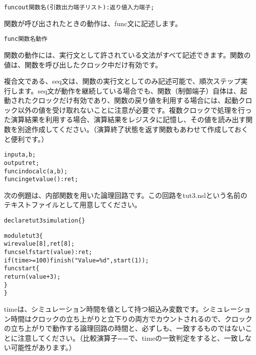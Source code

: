 \begin{reviewemlist}
\begin{alltt}
func\textunderscore{}out 関数名(引数出力端子リスト)  : 返り値入力端子 ;
\end{alltt}
\end{reviewemlist}

関数が呼び出されたときの動作は、func文に記述します。

\begin{reviewemlist}
\begin{alltt}
func 関数名 動作
\end{alltt}
\end{reviewemlist}

関数の動作には、実行文として許されている文法がすべて記述できます。関数の値は、関数を呼び出したクロック中だけ有効です。

複合文である、seq文は、関数の実行文としてのみ記述可能で、順次ステップ実行します。seq文が動作を継続している場合でも、関数（制御端子）自体は、起動されたクロックだけ有効であり、関数の戻り値を利用する場合には、起動クロック以外の値を受け取れないことに注意が必要です。複数クロックで処理を行った演算結果を利用する場合、演算結果をレジスタに記憶し、その値を読み出す関数を別途作成してください。（演算終了状態を返す関数もあわせて作成しておくと便利です。）

\begin{reviewemlist}
\begin{alltt}
input a,b;
output ret;
func\textunderscore{}in  do\textunderscore{}calc(a,b);
func\textunderscore{}in  get\textunderscore{}value(): ret;
\end{alltt}
\end{reviewemlist}

次の例題は、内部関数を用いた論理回路です。この回路をtut3.nslという名前のテキストファイルとして用意してください。

\begin{reviewlist}
\begin{alltt}
declare tut3 simulation \{ \}

module tut3 \{
   wire value[8], ret[8];
   func\textunderscore{}self  start(value) : ret;
   if(\textunderscore{}time\textgreater{}=100) \textunderscore{}finish("Value = \%d",start(1));
   func start \{
       return ( value + 3 );
   \}
\}
\end{alltt}
\end{reviewlist}


\textunderscore{}timeは、シミュレーション時間を値として持つ組込み変数です。シミュレーション時間はクロックの立ち上がりと立下りの両方でカウントされるので、クロックの立ち上がりで動作する論理回路の時間と、必ずしも、一致するものではないことに注意してください。（比較演算子==で、\textunderscore{}timeの一致判定をすると、一致しない可能性があります。）

